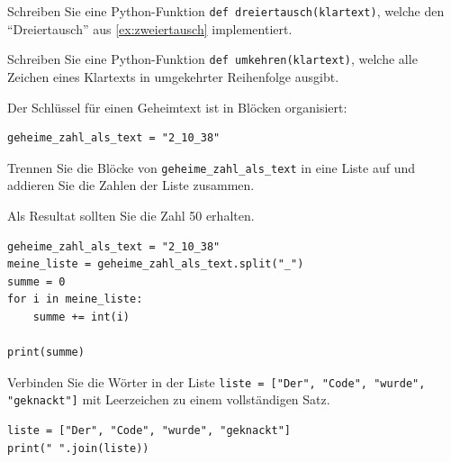 \begin{myexercise}
    Schreiben Sie eine Python-Funktion \lstinline|def dreiertausch(klartext)|, welche den \enquote{Dreiertausch} aus \cref{ex:zweiertausch} implementiert.
    \begin{myanswer}
        
    \end{myanswer}
\end{myexercise}

\begin{myexercise}
    Schreiben Sie eine Python-Funktion \lstinline|def umkehren(klartext)|, welche alle Zeichen eines Klartexts in umgekehrter Reihenfolge ausgibt.
    \begin{myanswer}
        
    \end{myanswer}
\end{myexercise}

\newpage


\begin{myexercise}
    Der Schlüssel für einen Geheimtext ist in Blöcken organisiert:

    \begin{lstlisting}
geheime_zahl_als_text = "2_10_38"
\end{lstlisting}

    Trennen Sie die Blöcke von \lstinline|geheime_zahl_als_text| in eine Liste auf und addieren Sie die Zahlen der Liste zusammen.

    Als Resultat sollten Sie die Zahl 50 erhalten.
    \begin{myanswer}
        \begin{lstlisting}
geheime_zahl_als_text = "2_10_38"
meine_liste = geheime_zahl_als_text.split("_")
summe = 0
for i in meine_liste:
    summe += int(i)

print(summe)
\end{lstlisting}
    \end{myanswer}
\end{myexercise}

\begin{myexercise}
    Verbinden Sie die Wörter in der Liste \lstinline|liste = ["Der", "Code", "wurde", "geknackt"]| mit Leerzeichen zu einem vollständigen Satz.
    \begin{myanswer}
        \begin{lstlisting}
liste = ["Der", "Code", "wurde", "geknackt"]
print(" ".join(liste))
\end{lstlisting}
    \end{myanswer}
\end{myexercise}

